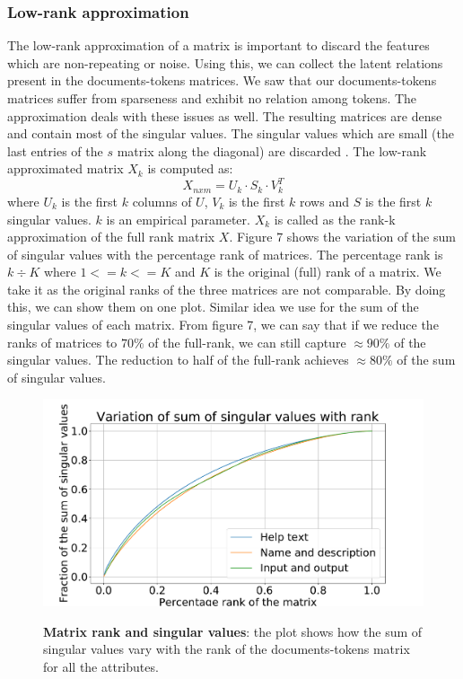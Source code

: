     \subsubsection{Low-rank approximation}
    The low-rank approximation of a matrix is important to discard the features which are non-repeating or noise. Using this, we can collect the latent relations present in the documents-tokens matrices. We saw that our documents-tokens matrices suffer from sparseness and exhibit no relation among tokens. The approximation deals with these issues as well. The resulting matrices are dense and contain most of the singular values. The singular values which are small (the last entries of the $s$ matrix along the diagonal) are discarded \cite{DBLP:journals/corr/Yang15b}. The low-rank approximated matrix $X_k$ is computed as:
    \begin{equation}
    X_{nxm} = U_{k} \cdot S_{k} \cdot V_{k}^T
    \end{equation}
    where $U_{k}$ is the first $k$ columns of $U$, $V_{k}$ is the first $k$ rows and $S$ is the first $k$ singular values. $k$ is an empirical parameter. $X_k$ is called as the rank-k approximation of the full rank matrix $X$. Figure 7 shows the variation of the sum of singular values with the percentage rank of matrices. The percentage rank is $k \div K$ where $1 <= k <= K$ and $K$ is the original (full) rank of a matrix. We take it as the original ranks of the three matrices are not comparable. By doing this, we can show them on one plot. Similar idea we use for the sum of the singular values of each matrix. From figure 7, we can say that if we reduce the ranks of matrices to $70\%$ of the full-rank, we can still capture $\approx 90\%$ of the singular values. The reduction to half of the full-rank achieves $\approx 80\%$ of the sum of singular values. 

\begin{figure}[h]
\begin{centering}
    {\includegraphics[scale=0.33]{figures/Rank_eigen_values.pdf}}
    \caption[Rank singular values]{\textbf{Matrix rank and singular values}: the plot shows how the sum of singular values vary with the rank of the documents-tokens matrix for all the attributes.}
\end{centering}
\end{figure}

